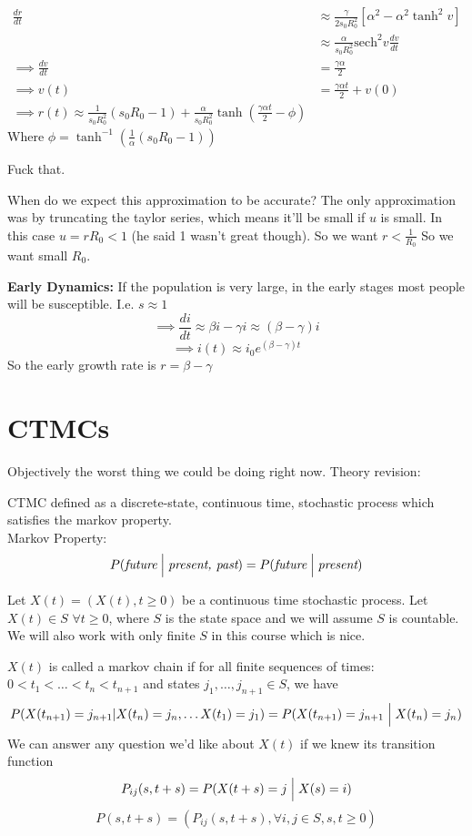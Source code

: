 \documentclass{X:/Documents/Coding/Latex/myassignment}
\begin{document}
\begin{align*}
    \frac{dr}{dt}&\approx \frac{\gamma}{2s_0R_0^2} \left[\alpha^2 - \alpha^2 \tanh^2v\right]\\
    &\approx \frac{\alpha}{s_0R_0^2} \text{sech}^2v \frac{dv}{dt}\\
    \implies \frac{dv}{dt} &= \frac{\gamma \alpha}{2}\\
    \implies v(t) &= \frac{\gamma\alpha t}{2} + v(0)\\
    \implies r(t) \approx \frac{1}{s_0R_0^2} (s_0R_0-1) + \frac{\alpha}{s_0R_0^2} \tanh \left(\frac{\gamma\alpha t}{2} - \phi\right)
\end{align*}
Where $\phi = \tanh^{-1}(\frac1\alpha (s_0R_0-1))$

Fuck that.

When do we expect this approximation to be accurate?
The only approximation was by truncating the taylor series, which means it'll be small if $u$ is small. In this case $u = rR_0 < 1$ (he said 1 wasn't great though). So we want $r < \frac{1}{R_0}$
So we want small $R_0$. 


\textbf{Early Dynamics:}
If the population is very large, in the early stages most people will be susceptible. I.e. $s\approx 1$
\[\implies \frac{di}{dt} \approx \beta i -\gamma i \approx (\beta-\gamma)i\]
\[\implies i(t) \approx i_0 e^{(\beta-\gamma)t}\]
So the early growth rate is $r = \beta-\gamma$


\section{CTMCs}
Objectively the worst thing we could be doing right now.
Theory revision:

CTMC defined as a discrete-state, continuous time, stochastic process which satisfies the markov property.\\
Markov Property:
\[P(\textit{future}\Bigm| \textit{present, past}) = P(\textit{future}\Bigm| \textit{present}) \]

Let $X(t) = (X(t),t\geq 0)$ be a continuous time stochastic process. Let $X(t) \in S$ $\forall t \geq 0$, where $S$ is the state space and we will assume $S$ is countable. We will also work with only finite $S$ in this course which is nice.

$X(t)$ is called a markov chain if for all finite sequences of times: $0<t_1<\hdots<t_n<t_{n+1}$ and states $j_1,\hdots,j_{n+1} \in S$, we have
\[P(X(t_{n+1}) = j_{n+1} | X(t_n) = j_n, \hdots X(t_1) = j_1) = P(X(t_{n+1}) = j_{n+1} \Bigm| X(t_n) = j_n)\]
We can answer any question we'd like about $X(t)$ if we knew its transition function
\[P_{ij}(s,t+s) = P(X(t+s)=j \Bigm| X(s) = i)\]
\[P(s,t+s) = (P_{ij}(s,t+s), \forall i,j\in S,s,t \geq 0 )\]
\end{document}
